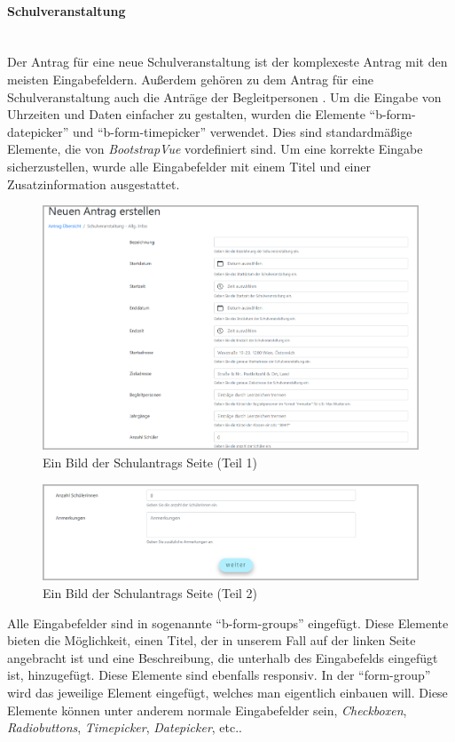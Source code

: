\paragraph{Schulveranstaltung}
~\\
Der Antrag für eine neue Schulveranstaltung ist der komplexeste Antrag mit den meisten Eingabefeldern. Außerdem gehören zu dem Antrag für eine Schulveranstaltung auch die Anträge der Begleitpersonen . Um die Eingabe von Uhrzeiten und Daten einfacher zu gestalten, wurden die Elemente \enquote{b-form-datepicker} und \enquote{b-form-timepicker} verwendet. Dies sind standardmäßige Elemente, die von \textit{BootstrapVue} vordefiniert sind. Um eine korrekte Eingabe sicherzustellen, wurde alle Eingabefelder mit einem Titel und einer Zusatzinformation ausgestattet.
\begin{figure}[H]
	\centering
	\includegraphics[width=1\linewidth]{images/website/schul_1}
	\caption[Neuer Schulantrag Seite (Teil 1)]{Ein Bild der Schulantrags Seite (Teil 1)}
	\label{fig:schulantrag1}
\end{figure}
\begin{figure}[H]
	\centering
	\includegraphics[width=1\linewidth]{images/website/schul_2}
	\caption[Neuer Schulantrag Seite (Teil 2)]{Ein Bild der Schulantrags Seite (Teil 2)}
	\label{fig:schulantrag2}
\end{figure}
Alle Eingabefelder sind in sogenannte \enquote{b-form-groups} eingefügt. Diese Elemente bieten die Möglichkeit, einen Titel, der in unserem Fall auf der linken Seite angebracht ist und eine Beschreibung, die unterhalb des Eingabefelds eingefügt ist, hinzugefügt. Diese Elemente sind ebenfalls responsiv. In der \enquote{form-group} wird das jeweilige Element eingefügt, welches man eigentlich einbauen will. Diese Elemente können unter anderem normale Eingabefelder sein, \textit{Checkboxen}, \textit{Radiobuttons}, \textit{Timepicker}, \textit{Datepicker}, etc.. 
